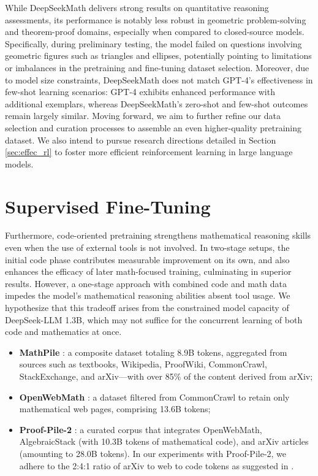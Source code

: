 While DeepSeekMath delivers strong results on quantitative reasoning assessments, its performance is notably less robust in geometric problem-solving and theorem-proof domains, especially when compared to closed-source models. Specifically, during preliminary testing, the model failed on questions involving geometric figures such as triangles and ellipses, potentially pointing to limitations or imbalances in the pretraining and fine-tuning dataset selection. Moreover, due to model size constraints, DeepSeekMath does not match GPT-4’s effectiveness in few-shot learning scenarios: GPT-4 exhibits enhanced performance with additional exemplars, whereas DeepSeekMath's zero-shot and few-shot outcomes remain largely similar. Moving forward, we aim to further refine our data selection and curation processes to assemble an even higher-quality pretraining dataset. We also intend to pursue research directions detailed in Section \ref{sec:effec_rl} to foster more efficient reinforcement learning in large language models.

\section{Supervised Fine-Tuning}

Furthermore, code-oriented pretraining strengthens mathematical reasoning skills even when the use of external tools is not involved. In two-stage setups, the initial code phase contributes measurable improvement on its own, and also enhances the efficacy of later math-focused training, culminating in superior results. However, a one-stage approach with combined code and math data impedes the model’s mathematical reasoning abilities absent tool usage. We hypothesize that this tradeoff arises from the constrained model capacity of DeepSeek-LLM 1.3B, which may not suffice for the concurrent learning of both code and mathematics at once.

\begin{itemize}[topsep=0pt]
    \item \textbf{MathPile} \citep{mathpile}: a composite dataset totaling 8.9B tokens, aggregated from sources such as textbooks, Wikipedia, ProofWiki, CommonCrawl, StackExchange, and arXiv—with over 85\% of the content derived from arXiv;
    \item \textbf{OpenWebMath} \citep{openwebmath}: a dataset filtered from CommonCrawl to retain only mathematical web pages, comprising 13.6B tokens;
    \item \textbf{Proof-Pile-2} \citep{llemma}: a curated corpus that integrates OpenWebMath, AlgebraicStack (with 10.3B tokens of mathematical code), and arXiv articles (amounting to 28.0B tokens). In our experiments with Proof-Pile-2, we adhere to the 2:4:1 ratio of arXiv to web to code tokens as suggested in \cite{llemma}.
\end{itemize}

